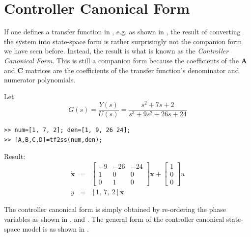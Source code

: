 \section*{Controller Canonical Form}
\ifslidesonly
\begin{slide}
\end{slide}
\fi
If one defines a transfer function in \Matlab{}, e.g. as shown in
, the result of converting the system into
state-space form is rather surprisingly not the companion form we
have seen before. Instead, the result is what is known as the
\emph{Controller Canonical Form}. This is still a companion form
because the coefficients of the $\mathbf{A}$ and $\mathbf{C}$
matrices are the coefficients of the transfer function's
denominator and numerator polynomials.
\begin{slide}\label{slide:l5s5}
Let \[ G(s)
=\frac{Y(s)}{U(s)} = \frac{s^2 + 7s + 2 }{s^3 + 9s^2 + 26s + 24}\]
\begin{verbatim}
>> num=[1, 7, 2]; den=[1, 9, 26 24];
>> [A,B,C,D]=tf2ss(num,den);
\end{verbatim}
Result:
\begin{eqnarray*}
\dot{\mathbf{x}} & = &\left[\begin{array}{ccc}
  -9 & -26 & -24  \\
  1 & 0 & 0  \\
  0 & 1  & 0
 \end{array}\right]\mathbf{x}+\left[\begin{array}{c}
  1 \\
  0 \\
  0
\end{array}\right]u\\
y & = & [1,\ 7,\ 2] \mathbf{x}.\end{eqnarray*}
\end{slide}
The controller canonical form is simply obtained by re-ordering
the phase variables as shown in ,
 and . The general form of the
controller canonical state-space model is as shown in
.
